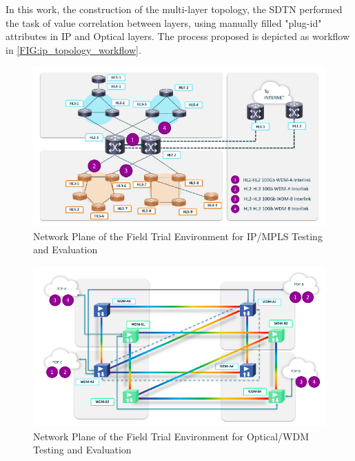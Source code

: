 \documentclass[a4paper,fleqn]{cas-dc}
\begin{document}
In this work, the construction of the multi-layer topology, the SDTN performed the task of value correlation between layers, using manually filled "plug-id" attributes in IP and Optical layers. The process proposed is depicted as workflow in \cref{FIG:ip_topology_workflow}.


\begin{figure}
	\centering
		\includegraphics[scale=1]{figs/field_trial_environment_ip.pdf}
	\caption{Network Plane of the Field Trial Environment for IP/MPLS Testing and Evaluation}
	\label{FIG:field_trial_ip}
\end{figure}

\begin{figure}
	\centering
		\includegraphics[scale=1]{figs/field_trial_environment_optical.pdf}
	\caption{Network Plane of the Field Trial Environment for Optical/WDM Testing and Evaluation}
	\label{FIG:field_trial_optical}
\end{figure}
\end{document}
